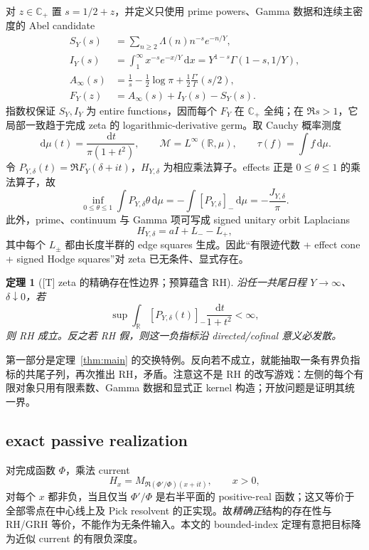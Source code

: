 \documentclass[UTF8,11pt,a4paper]{ctexart}
\newtheorem{theorem}{定理}[section]
\theoremstyle{definition}
\theoremstyle{remark}
\newcommand{\C}{\mathbb C}
\newcommand{\R}{\mathbb R}
\newcommand{\dd}{\,\mathrm d}
\newcommand{\1}{\mathbf 1}
\newcommand{\cM}{\mathcal M}
\newcommand{\statusT}{\textnormal{[T]}}
\begin{document}
对 $z\in\C_+$ 置 $s=1/2+z$，并定义只使用 prime powers、Gamma 数据和连续主密度的 Abel candidate
\begin{align*}
 S_Y(s)&=\sum_{n\geq2}\Lambda(n)n^{-s}e^{-n/Y},\\
 I_Y(s)&=\int_1^\infty x^{-s}e^{-x/Y}\dd x
       =Y^{1-s}\Gamma(1-s,1/Y),\\
 A_\infty(s)&=\frac1s-\frac12\log\pi
              +\frac12\frac{\Gamma'}{\Gamma}(s/2),\\
 F_Y(z)&=A_\infty(s)+I_Y(s)-S_Y(s).
\end{align*}
指数权保证 $S_Y,I_Y$ 为 entire functions，因而每个 $F_Y$ 在 $\C_+$ 全纯；在 $\Re s>1$，它局部一致趋于完成 zeta 的 logarithmic-derivative germ。取 Cauchy 概率测度
\[
  \dd\mu(t)=\frac{\dd t}{\pi(1+t^2)},\qquad
  \cM=L^\infty(\R,\mu),\qquad \tau(f)=\int f\dd\mu.
\]
令 $P_{Y,\delta}(t)=\Re F_Y(\delta+it)$，$H_{Y,\delta}$ 为相应乘法算子。effects 正是 $0\leq\theta\leq1$ 的乘法算子，故
\[
 \inf_{0\leq\theta\leq1}\int P_{Y,\delta}\theta\dd\mu
 =-\int[P_{Y,\delta}]_-\dd\mu=-\frac{J_{Y,\delta}}\pi.
\]
此外，prime、continuum 与 Gamma 项可写成 signed unitary orbit Laplacians
\[
  H_{Y,\delta}=aI+L_- -L_+,
\]
其中每个 $L_\pm$ 都由长度半群的 edge squares 生成。因此“有限迹代数 + effect cone + signed Hodge squares”对 zeta 已无条件、显式存在。

\begin{theorem}[\statusT{} zeta 的精确存在性边界；预算蕴含 RH]
沿任一共尾日程 $Y\to\infty$、$\delta\downarrow0$，若
\[
  \sup\int_\R[P_{Y,\delta}(t)]_-\frac{\dd t}{1+t^2}<\infty,
\]
则 RH 成立。反之若 RH 假，则这一负指标沿 directed/cofinal 意义必发散。
\end{theorem}

第一部分是定理~\ref{thm:main} 的交换特例。反向若不成立，就能抽取一条有界负指标的共尾子列，再次推出 RH，矛盾。注意这不是 RH 的改写游戏：左侧的每个有限对象只用有限素数、Gamma 数据和显式正 kernel 构造；开放问题是证明其统一界。

\subsection{exact passive realization}

对完成函数 $\Phi$，乘法 current
\[
  H_x=M_{\Re(\Phi'/\Phi)(x+it)},\qquad x>0,
\]
对每个 $x$ 都非负，当且仅当 $\Phi'/\Phi$ 是右半平面的 positive-real 函数；这又等价于全部零点在中心线上及 Pick resolvent 的正实现。故\emph{精确正}结构的存在性与 RH/GRH 等价，不能作为无条件输入。本文的 bounded-index 定理有意把目标降为近似 current 的有限负深度。
\end{document}

